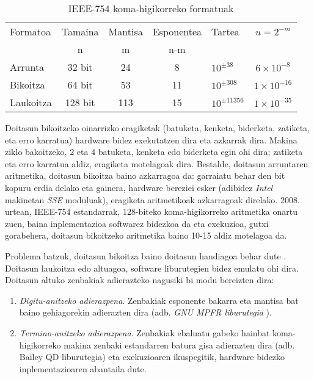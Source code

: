 \begin{table} [h!]
\caption[IEEE-754 koma-higikorreko formatuak]{IEEE-754 koma-higikorreko formatuak}
\label{tab:koma-higikorreko-aritmetikak}       %
\centering
\begin{tabular}{ l c c c l c} 
 \hline
 Formatoa      &  Tamaina    & Mantisa   & Esponentea  & Tartea           &  $u=2^{-m}$          \\
               &    n        & m         & n-m         &                  &                      \\
   \hline
 Arrunta   & 32 bit      & 24  & 8  & $10^{\pm 38}$    &  $6 \times 10^{-8}$   \\	    
 Bikoitza  & 64 bit      & 53  & 11 & $10^{\pm 308}$   &  $1 \times 10^{-16}$   \\
 Laukoitza & 128 bit     & 113 & 15 & $10^{\pm 11356}$ &  $1 \times 10^{-35}$   \\
\hline
\end{tabular}
\end{table}


Doitasun bikoitzeko oinarrizko eragiketak (batuketa, kenketa, biderketa, zatiketa, eta erro karratua) hardware bidez exekutatzen dira \cite{Muller2009} eta azkarrak dira. Makina ziklo bakoitzeko, $2$ eta $4$ batuketa, kenketa edo biderketa egin ohi dira; zatiketa eta erro karratua aldiz, eragiketa motelagoak dira. Bestalde, doitasun arruntaren  aritmetika, doitasun bikoitza baino azkarragoa da: garraiatu behar den bit kopuru erdia delako eta gainera, hardware bereziei esker (adibidez \emph{Intel} makinetan \emph{SSE} moduluak), eragiketa aritmetikoak azkarragoak direlako. 2008. urtean, IEEE-$754$ estandarrak, $128$-biteko koma-higikorreko aritmetika onartu zuen, baina  inplementazioa  softwarez bidezkoa da eta exekuzioa, gutxi gorabehera, doitasun bikoitzeko aritmetika baino 10-15 aldiz motelagoa da.

Problema batzuk, doitasun bikoitza baino doitasun handiagoa behar dute \cite{Joldes2016}. Doitasun laukoitza edo altuagoa, software liburutegien bidez emulatu ohi dira. Doitasun altuko zenbakiak adierazteko nagusiki bi modu bereizten dira:   

\begin{enumerate}
\item \emph{Digitu-anitzeko adierazpena}. Zenbakiak esponente bakarra eta mantisa bat baino gehiagorekin adierazten dira (adb. \emph{GNU MPFR liburutegia} \cite{Fousse2007}).
\item \emph{Termino-anitzeko adierazpena}. Zenbakiak  ebaluatu gabeko hainbat koma-higikorreko makina zenbaki estandarren batura gisa adierazten dira (adb. Bailey QD liburutegia) \cite{Hida2001} eta exekuzioaren ikuspegitik, hardware bidezko inplementazioaren abantaila dute.    
\end{enumerate}

